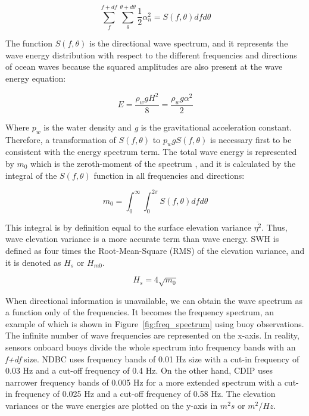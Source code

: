 \begin{equation}
\sum_{f}^{f+df} \sum_{\theta}^{\theta+d\theta} \frac{1}{2} \alpha^{2}_{n} = S\left(f,\theta\right)dfd\theta
\label{eqn:amplitude_spectrum}
\end{equation}
 
The function $S\left(f,\theta\right)$ is the directional wave spectrum, and it represents the wave energy distribution with respect to the different frequencies and directions of ocean waves because the squared amplitudes are also present at the wave energy equation:
 
\begin{equation}
E = \frac{\rho_{w}gH^{2}}{8} = \frac{\rho_{w}g\alpha^{2}}{2} 
\label{eqn:wave_energy}
\end{equation}

Where $p_{w}$ is the water density and \emph{g} is the gravitational acceleration constant. Therefore, a transformation of $S(f,\theta)$ to $p_{w}gS(f,\theta)$ is necessary first to be consistent with the energy spectrum term. The total wave energy is represented by $m_{0}$ which is the zeroth-moment of the spectrum \cite{Ardhuin2019a}, and it is calculated by the integral of the $S(f,\theta)$ function in all frequencies and directions:

\begin{equation}
m_{0} = \int_{0}^{\infty} \int_{0}^{2\pi} S(f,\theta) df d\theta
\label{eqn:total_wave_energy}
\end{equation}

This integral is by definition equal to the surface elevation variance $\overline{\eta^{2}}$. Thus, wave elevation variance is a more accurate term than wave energy. SWH is defined as four times the Root-Mean-Square (RMS) of the elevation variance, and it is denoted as \emph{$H_{s}$} or \emph{$H_{m0}$}.

\begin{equation}
H_{s} = 4\sqrt{m_{0}}
\label{eqn:swh_hs}
\end{equation}
 
 
 
When directional information is unavailable, we can obtain the wave spectrum as a function only of the frequencies. It becomes the frequency spectrum, an example of which is shown in Figure~\ref{fig:freq_spectrum} using buoy observations. The infinite number of wave frequencies are represented on the x-axis. In reality, sensors onboard buoys divide the whole spectrum into frequency bands with an \emph{f+df} size. NDBC uses frequency bands of 0.01 Hz size with a cut-in frequency of 0.03 Hz and a cut-off frequency of 0.4 Hz. On the other hand, CDIP uses narrower frequency bands of 0.005 Hz for a more extended spectrum with a cut-in frequency of 0.025 Hz and a cut-off frequency of 0.58 Hz. The elevation variances or the wave energies are plotted on the y-axis in $m^{2}s$ or $m^{2}/Hz$.


